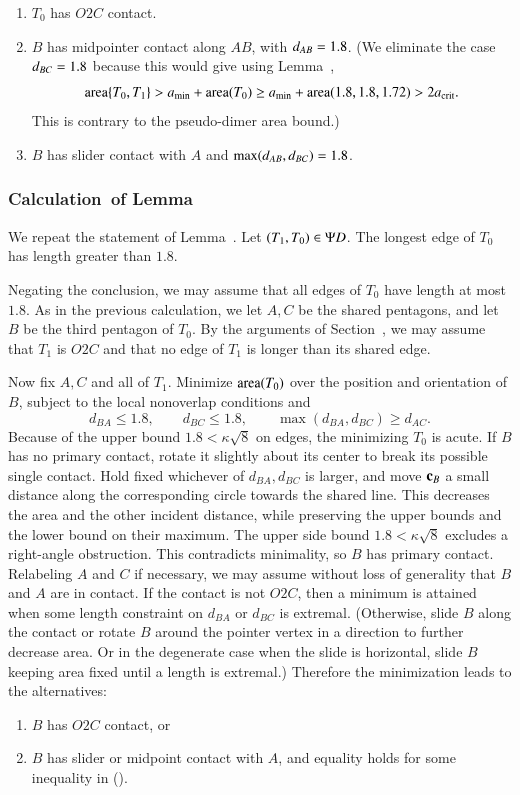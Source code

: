 \begin{enumerate}
\item $T_0$ has $O2C$ contact.
\item $B$ has midpointer contact along $AB$, with $d_{AB}=1.8$.  (We
  eliminate the case $d_{BC}=1.8$ because this would give using
  Lemma~,
\[
{\operatorname{area}}\{T_0,T_1\} > a_\text{min} + {\operatorname{area}}(T_0) \ge a_\text{min} + {\operatorname{area}}(1.8,1.8,1.72) > 2a_\text{crit}.
\]
This is contrary to the pseudo-dimer area bound.)
\item $B$ has slider contact with $A$ and $\max(d_{AB},d_{BC})=1.8$.
\end{enumerate}

\subsubsection{Calculation~of Lemma~} 

We repeat the statement of Lemma~.
Let $(T_1,T_0)\in \Psi D$.  The longest edge of $T_0$
has length greater than $1.8$. %

Negating the conclusion, we may assume that all edges of $T_0$ have
length at most $1.8$.  As in the previous calculation, we let $A,C$ be
the shared pentagons, and let $B$ be the third pentagon of $T_0$.
By the arguments of Section~, we may assume that $T_1$
is $O2C$ and that no edge of $T_1$ is longer than its shared edge.

Now fix $A,C$ and all of $T_1$.
Minimize \({\operatorname{area}}(T_0)\) over the position and
orientation of \(B\), subject to the local nonoverlap conditions and
\begin{equation}\label{eqn:pseudo2-constraint}
d_{BA}\le1.8,\qquad d_{BC}\le1.8,\qquad \max(d_{BA},d_{BC})\ge d_{AC}.
\end{equation}
Because of the upper bound $1.8 < \kappa\sqrt8$ on edges, the minimizing
$T_0$ is acute.
If $B$ has no primary contact, rotate it slightly about its center
to break its possible single contact. Hold fixed whichever of
$d_{BA},d_{BC}$ is larger, and move ${\mathbf c}_B$ a small distance along the
corresponding circle towards the shared line. This decreases the
area and the other incident distance, while preserving the upper
bounds and the lower bound on their maximum. The upper side bound
$1.8<\kappa\sqrt8$ excludes a right-angle obstruction. This
contradicts minimality, so $B$ has primary contact.  Relabeling $A$ and $C$ if necessary, we may assume
without loss of generality that $B$ and $A$ are in contact.
If the contact is not $O2C$, then a minimum
is attained when some length constraint on $d_{BA}$ or $d_{BC}$
is extremal. (Otherwise, slide $B$ along the contact or rotate $B$ around the
pointer vertex in a direction to further decrease area. Or in the degenerate
case when the slide is horizontal, slide $B$ keeping area fixed until a
length is extremal.)
Therefore the minimization leads to the alternatives:
\begin{enumerate}
\item  $B$ has $O2C$ contact, or
\item $B$ has slider or midpoint contact with $A$, and
  equality holds for some inequality in ().
\end{enumerate}

